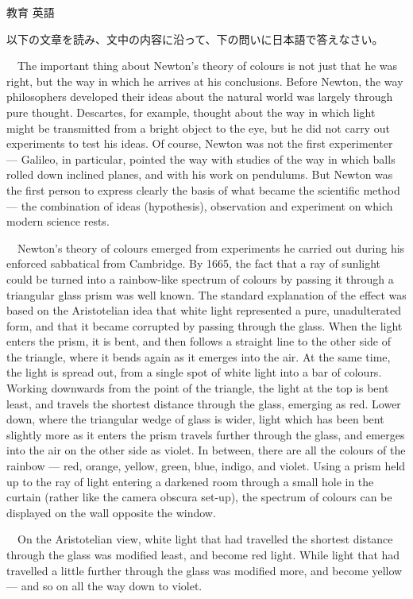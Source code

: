 \documentclass[fleqn]{jbook}
\begin{document}
\begin{question}{教育 英語}{}
\begin{subquestions}
\SubQuestion
  以下の文章を読み、文中の内容に沿って、下の問いに日本語で答えなさい。
\baselineskip=12pt

  　The important thing about Newton's theory of colours is not just
  that he was right, but the way in which he arrives at his
  conclusions. Before Newton, the way philosophers developed their
  ideas about the natural world was largely through pure thought.
  Descartes, for example, thought about the way in which light might
  be transmitted from a bright object to the eye, but he did not
  carry out experiments to test his ideas. Of course, Newton was
  not the first experimenter --- Galileo, in particular, pointed the
  way with studies of the way in which balls rolled down inclined
  planes, and with his work on pendulums. But Newton was the first
  person to express clearly the basis of what became the scientific
  method --- the combination of ideas (hypothesis), observation and
  experiment on which modern science rests.

  　Newton's theory of colours emerged from experiments he carried
  out during his enforced sabbatical from Cambridge. By 1665, the
  fact that a ray of sunlight could be turned into a rainbow-like
  spectrum of colours by passing it through a triangular glass
  prism was well known. The standard explanation of the effect
  was based on the Aristotelian idea that white light represented
  a pure, unadulterated form, and that it became corrupted by
  passing through the glass. When the light enters the prism, it
  is bent, and then follows a straight line to the other side of
  the triangle, where it bends again as it emerges into the air.
  At the same time, the light is spread out, from a single spot
  of white light into a bar of colours. Working downwards from
  the point of the triangle, the light at the top is bent least,
  and travels the shortest distance through the glass, emerging
  as red. Lower down, where the triangular wedge of glass is wider,
  light which has been bent slightly more as it enters the prism
  travels further through the glass, and emerges into the air on
  the other side as violet. In between, there are all the colours
  of the rainbow --- red, orange, yellow, green, blue, indigo, and
  violet. Using a prism held up to the ray of light entering a
  darkened room through a small hole in the curtain (rather like
  the camera obscura set-up), the spectrum of colours can be
  displayed on the wall opposite the window.

  　On the Aristotelian view, white light that had travelled the
  shortest distance through the glass was modified least, and
  become red light. While light that had travelled a little further
  through the glass was modified more, and become yellow --- and
  so on all the way down to violet.


\end{subquestions}
\end{question}
\end{document}
